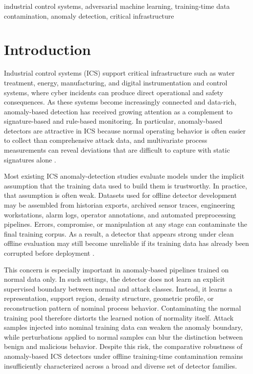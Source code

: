 \documentclass[10pt,conference]{IEEEtran}
\begin{document}
\begin{IEEEkeywords}
industrial control systems, adversarial machine learning, training-time data contamination, anomaly detection, critical infrastructure
\end{IEEEkeywords}

\section{Introduction}

Industrial control systems (ICS) support critical infrastructure such as water treatment, energy, manufacturing, and digital instrumentation and control systems, where cyber incidents can produce direct operational and safety consequences. As these systems become increasingly connected and data-rich, anomaly-based detection has received growing attention as a complement to signature-based and rule-based monitoring. In particular, anomaly-based detectors are attractive in ICS because normal operating behavior is often easier to collect than comprehensive attack data, and multivariate process measurements can reveal deviations that are difficult to capture with static signatures alone \cite{goh2017rnn,koay2023landscape,ramachandran2021challenges}.

Most existing ICS anomaly-detection studies evaluate models under the implicit assumption that the training data used to build them is trustworthy. In practice, that assumption is often weak. Datasets used for offline detector development may be assembled from historian exports, archived sensor traces, engineering workstations, alarm logs, operator annotations, and automated preprocessing pipelines. Errors, compromise, or manipulation at any stage can contaminate the final training corpus. As a result, a detector that appears strong under clean offline evaluation may still become unreliable if its training data has already been corrupted before deployment \cite{rubinstein2009antidote,cina2022wild}.

This concern is especially important in anomaly-based pipelines trained on normal data only. In such settings, the detector does not learn an explicit supervised boundary between normal and attack classes. Instead, it learns a representation, support region, density structure, geometric profile, or reconstruction pattern of nominal process behavior. Contaminating the normal training pool therefore distorts the learned notion of normality itself. Attack samples injected into nominal training data can weaken the anomaly boundary, while perturbations applied to normal samples can blur the distinction between benign and malicious behavior. Despite this risk, the comparative robustness of anomaly-based ICS detectors under offline training-time contamination remains insufficiently characterized across a broad and diverse set of detector families.
\end{document}
